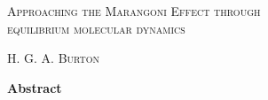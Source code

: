 \thispagestyle{plain}
\begin{center}
\textsc{\Large Approaching the Marangoni Effect through\\ equilibrium molecular dynamics}

    \vspace{0.2cm}
    \normalsize{{\textsc{H. G. A. Burton}}}
    
\vspace{0.2cm}
    \normalsize{\textbf{Abstract}}
\end{center}
